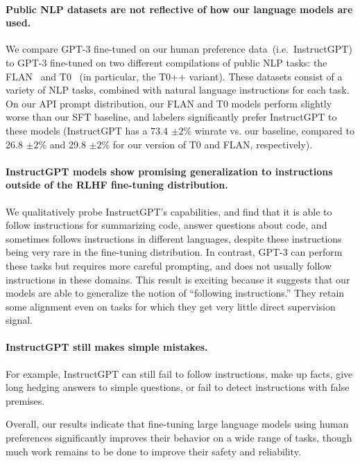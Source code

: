 \documentclass{article}
\begin{document}
\paragraph{Public NLP datasets are not reflective of how our language models are used.} 
We compare GPT-3 fine-tuned on our human preference data~(i.e.\ InstructGPT) to GPT-3 fine-tuned on two different compilations of public NLP tasks: the FLAN~\citep{wei2021finetuned} and T0~\citep{sanh2021multitask} (in particular, the T0++ variant). These datasets consist of a variety of NLP tasks, combined with natural language instructions for each task. On our API prompt distribution, our FLAN and T0 models perform slightly worse than our SFT baseline, and labelers significantly prefer InstructGPT to these models (InstructGPT has a 73.4 $\pm 2\%$ winrate vs. our baseline, compared to 26.8 $\pm 2\%$ and 29.8 $\pm 2\%$ for our version of T0 and FLAN, respectively). 


\paragraph{InstructGPT models show promising generalization to instructions outside of the RLHF fine-tuning distribution.} We qualitatively probe InstructGPT's capabilities, and find that it is able to follow instructions for summarizing code, answer questions about code, and sometimes follows instructions in different languages, despite these instructions being very rare in the fine-tuning distribution. In contrast, GPT-3 can perform these tasks but requires more careful prompting, and does not usually follow instructions in these domains.
This result is exciting because it suggests that our models are able to generalize the notion of ``following instructions.'' They retain some alignment even on tasks for which they get very little direct supervision signal.

\paragraph{InstructGPT still makes simple mistakes.} For example, InstructGPT can still fail to follow instructions, make up facts, give long hedging answers to simple questions, or fail to detect instructions with false premises. 

\vspace{2mm}
Overall, our results indicate that fine-tuning large language models using human preferences significantly improves their behavior on a wide range of tasks, though much work remains to be done to improve their safety and reliability.
\end{document}
